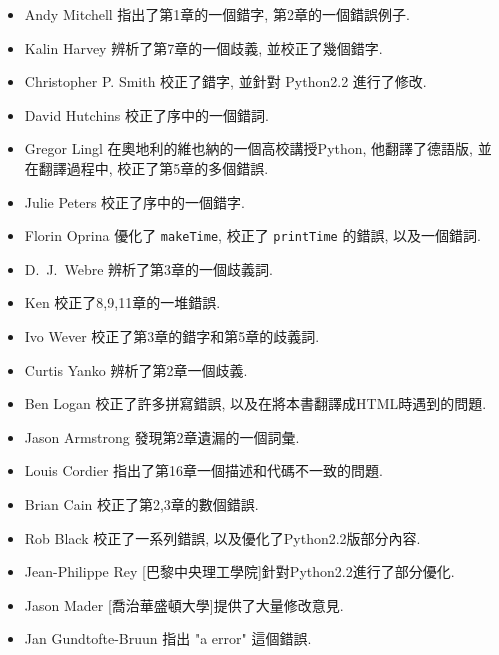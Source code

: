 \documentclass[10pt]{book}
\begin{document}
\begin{itemize}
\item Andy Mitchell 指出了第1章的一個錯字, 第2章的一個錯誤例子. 

\item Kalin Harvey 辨析了第7章的一個歧義, 並校正了幾個錯字. 

\item Christopher P. Smith 校正了錯字, 並針對 Python2.2 進行了修改. 

\item David Hutchins 校正了序中的一個錯詞. 

\item Gregor Lingl 在奧地利的維也納的一個高校講授Python, 他翻譯了德語版, 並在翻譯過程中, 校正了第5章的多個錯誤. 

\item Julie Peters 校正了序中的一個錯字. 

\item Florin Oprina 優化了 {\tt makeTime}, 校正了 {\tt printTime} 的錯誤, 以及一個錯詞. 

\item D.~J.~Webre 辨析了第3章的一個歧義詞. 

\item Ken 校正了8,9,11章的一堆錯誤. 

\item Ivo Wever 校正了第3章的錯字和第5章的歧義詞. 

\item Curtis Yanko 辨析了第2章一個歧義. 

\item Ben Logan 校正了許多拼寫錯誤, 
以及在將本書翻譯成HTML時遇到的問題. 

\item Jason Armstrong 發現第2章遺漏的一個詞彙. 

\item Louis Cordier 指出了第16章一個描述和代碼不一致的問題. 

\item Brian Cain 校正了第2,3章的數個錯誤. 

\item Rob Black 校正了一系列錯誤, 以及優化了Python2.2版部分內容. 

\item Jean-Philippe Rey [巴黎中央理工學院]針對Python2.2進行了部分優化. 

\item Jason Mader [喬治華盛頓大學]提供了大量修改意見. 

\item Jan Gundtofte-Bruun 指出 "a error" 這個錯誤. 


\end{itemize}
\end{document}
